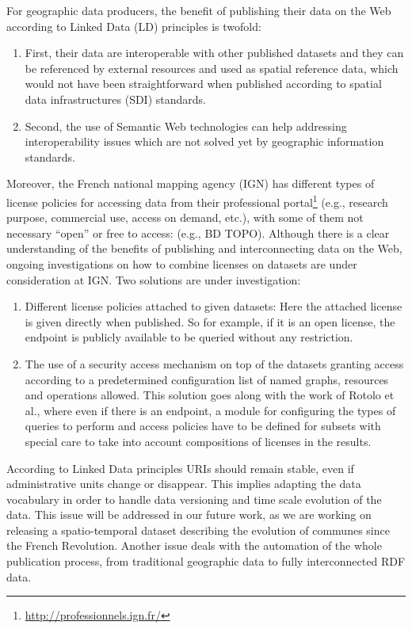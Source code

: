 For geographic data producers, the benefit of publishing their data on the Web according to Linked Data  (LD) principles is twofold:
\begin{enumerate}
\item First, their data are interoperable with other published datasets and they can be referenced by external resources and used as spatial reference data, which would not have been straightforward when published according to spatial data infrastructures (SDI) standards.
\item Second, the use of Semantic Web technologies can help addressing interoperability issues which are not solved yet by geographic information standards. 
\end{enumerate}
 
Moreover, the French national mapping agency (IGN) has different types of license policies for accessing data from their professional portal\footnote{\url{http://professionnels.ign.fr/}}  (e.g., research purpose, commercial use, access on demand, etc.), with some of them not necessary ``open'' or free to access: (e.g., BD TOPO\circledR). Although there is a clear understanding of the benefits of publishing and interconnecting data on the Web, ongoing investigations on how to combine licenses on datasets are under consideration at IGN. Two solutions are under investigation: 
\begin{enumerate}
\item Different license policies attached to given datasets: Here the attached license is given directly when published. So for example, if it is an open license, the endpoint is publicly available to be queried without any restriction.
\item The use of a security access mechanism on top of the datasets granting access according to a predetermined configuration list of named graphs, resources and operations allowed. This solution goes along with the work of Rotolo et al.\cite{rotolo2013deontic}, where even if there is an endpoint, a module for configuring the types of queries to perform and access policies have to be defined for subsets with special care to take into account compositions of licenses in the results.
\end{enumerate}
According to Linked Data principles URIs should remain stable, even if administrative units change or disappear. This implies adapting the data vocabulary in order to handle data versioning and time scale evolution of the data. This issue will be addressed in our future work, as we are working on releasing a spatio-temporal dataset describing the evolution of communes since the French Revolution. Another issue deals with the automation of the whole publication process, from traditional geographic data to fully interconnected RDF data.
